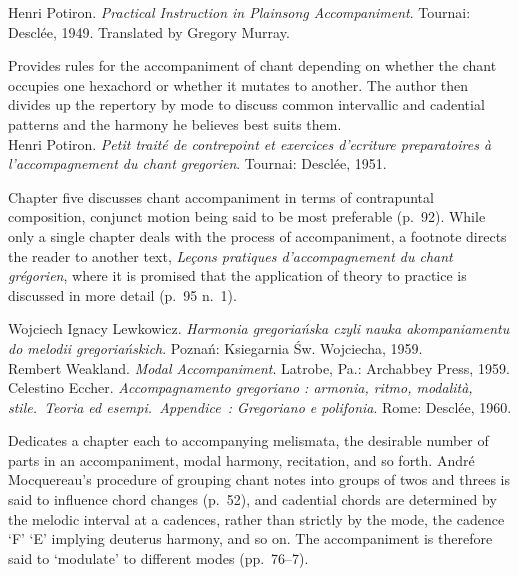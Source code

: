     \parindent=0pt
    \hangindent=0pt
  Henri Potiron. \emph{Practical Instruction in Plainsong Accompaniment}. Tournai:  Desclée, 1949. Translated by Gregory Murray.

     \parindent=20pt
     \hangindent=20pt
     Provides rules for the accompaniment of chant depending on whether the chant occupies one hexachord or whether it mutates to another. The author then divides up the repertory by mode to discuss common intervallic and cadential patterns and the harmony he believes best suits them.\\

    \parindent=0pt
    \hangindent=0pt
  Henri Potiron. \emph{Petit traité de contrepoint et exercices d'ecriture preparatoires à l'accompagnement du chant gregorien}. Tournai:  Desclée, 1951.

     \parindent=20pt
     \hangindent=20pt
     Chapter five discusses chant accompaniment in terms of contrapuntal composition, conjunct motion being said to be most preferable (p.~92). While only a single chapter deals with the process of accompaniment, a footnote directs the reader to another text, \emph{Leçons pratiques d'accompagnement du chant grégorien}, where it is promised that the application of theory to practice is discussed in more detail (p.~95 n.~1).\\\pagebreak{}

    \parindent=0pt
    \hangindent=0pt
  \covid{}Wojciech Ignacy Lewkowicz. \emph{Harmonia gregoriańska czyli nauka akompaniamentu do melodii gregoriańskich}. Poznań:  Ksiegarnia Św. Wojciecha, 1959. \\

    \parindent=0pt
    \hangindent=0pt
  \covid{}Rembert Weakland. \emph{Modal Accompaniment}. Latrobe, Pa.:  Archabbey Press, 1959. \\

    \parindent=0pt
    \hangindent=0pt
  Celestino Eccher. \emph{Accompagnamento gregoriano : armonia, ritmo, modalità, stile.\ Teoria ed esempi.\ Appendice~: Gregoriano e polifonia}. Rome:  Desclée, 1960.

     \parindent=20pt
     \hangindent=20pt
     Dedicates a chapter each to accompanying melismata, the desirable number of parts in an accompaniment, modal harmony, recitation, and so forth. André Mocquereau's procedure of grouping chant notes into groups of twos and threes is said to influence chord changes (p.~52), and cadential chords are determined by the melodic interval at a cadences, rather than strictly by the mode, the cadence `F' \rightarrow{} `E' implying deuterus harmony, and so on. The accompaniment is therefore said to `modulate' to different modes (pp.~76--7).\\

